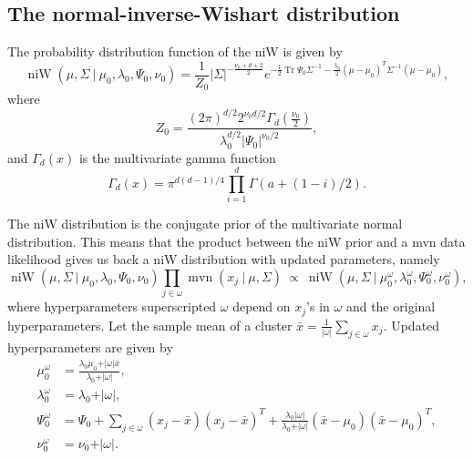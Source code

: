 \documentclass[11pt, oneside]{article}   	%
\DeclareMathOperator{\Tr}{Tr}
\DeclareMathOperator{\niW}{niW}
\begin{document}
\subsection{The normal-inverse-Wishart distribution}
The probability distribution function of the niW is given by
\begin{equation}
\niW(\mu, \Sigma~\vert~\mu_0, \lambda_0,\Psi_0,\nu_0) = \frac{1}{Z_0} \vert\Sigma\vert^{-\frac{\nu_0 + d + 2}{2}}e^{-\frac{1}{2}\Tr\Psi_0\Sigma^{-1} - \frac{\lambda_0}{2}(\mu - \mu_0)^T\Sigma^{-1}(\mu - \mu_0)},
\label{eq:niW}\end{equation}
where 
$$Z_0 = \frac{(2\pi)^{d/2} 2^{\nu_0 d/2} \Gamma_d(\frac{\nu_0}{2})}{\lambda_0^{d/2}\vert\Psi_0\vert^{\nu_0/2}},$$
and $\Gamma_d(x)$ is the multivariate gamma function
$$\Gamma_d(x) = \pi^{d(d-1)/4}\prod_{i=1}^d\Gamma(a + (1 - i)/2).$$

The niW distribution is the conjugate prior of the multivariate normal distribution. This means that the product between the niW prior and a mvn data likelihood gives us back a niW distribution with updated parameters, namely
\begin{equation}\niW(\mu, \Sigma~\vert~ \mu_0, \lambda_0,\Psi_0,\nu_0)\prod_{j\in\omega}\operatorname{mvn}(x_j~\vert~\mu,\Sigma)~\propto~\niW(\mu,\Sigma~\vert~\mu_0^\omega,\lambda_0^\omega,\Psi_0^\omega,\nu_0^\omega),
\label{eq:conjugation}\end{equation}
where hyperparameters superscripted $\omega$ depend on $x_j$'s in $\omega$ and the original hyperparameters. Let the sample mean of a cluster $\bar x = \frac{1}{\vert\omega\vert}\sum_{j\in\omega} x_j$. Updated hyperparameters are given by
\begin{equation}\begin{split}
\mu_0^\omega &= \frac{\lambda_0 \mu_0 + \vert\omega\vert \bar x}{\lambda_0 + \vert\omega\vert}, \\
\lambda_0^\omega &= \lambda_0 + \vert\omega\vert,\\
\Psi_0^\omega &= \Psi_0 + \sum_{j\in\omega}(x_j - \bar x)(x_j - \bar x)^T + \frac{\lambda_0\vert\omega\vert}{\lambda_0 + \vert\omega\vert}(\bar x - \mu_0)(\bar x - \mu_0)^T,\\
\nu_0^\omega &= \nu_0 + \vert\omega\vert.
\label{eq:updatedhp}\end{split}\end{equation}
\end{document}
